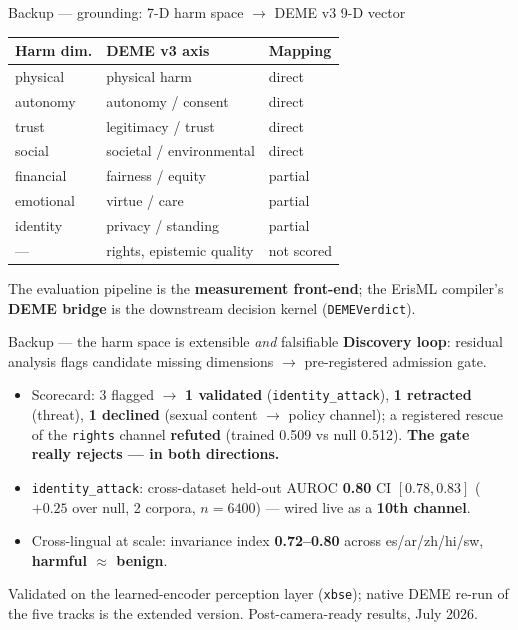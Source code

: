 \documentclass[aspectratio=169,11pt]{beamer}
\newcommand{\hi}[1]{\textcolor{cbblue}{\textbf{#1}}}
\newcommand{\gold}[1]{\textcolor{cborange}{\textbf{#1}}}
\begin{document}
\begin{frame}{Backup --- grounding: 7-D harm space $\rightarrow$ DEME v3 9-D vector}
\centering
\small
\begin{tabular}{@{}lll@{}}
\toprule
\textbf{Harm dim.} & \textbf{DEME v3 axis} & \textbf{Mapping}\\
\midrule
physical & physical harm & direct\\
autonomy & autonomy / consent & direct\\
trust & legitimacy / trust & direct\\
social & societal / environmental & direct\\
financial & fairness / equity & partial\\
emotional & virtue / care & partial\\
identity & privacy / standing & partial\\
--- & rights, epistemic quality & not scored\\
\bottomrule
\end{tabular}
\vfill
{\small The evaluation pipeline is the \hi{measurement front-end}; the ErisML compiler's \hi{DEME bridge} is the downstream decision kernel (\texttt{DEMEVerdict}).}
\end{frame}

\begin{frame}{Backup --- the harm space is extensible \emph{and} falsifiable}
\textbf{Discovery loop}: residual analysis flags candidate missing dimensions $\rightarrow$ pre-registered admission gate.
\begin{itemize}
  \item Scorecard: 3 flagged $\rightarrow$ \gold{1 validated} (\texttt{identity\_attack}), \gold{1 retracted} (threat), \gold{1 declined} (sexual content $\rightarrow$ policy channel); a registered rescue of the \texttt{rights} channel \gold{refuted} (trained 0.509 vs null 0.512). \hi{The gate really rejects --- in both directions.}
  \item \texttt{identity\_attack}: cross-dataset held-out AUROC \gold{0.80} CI $[0.78, 0.83]$ ($+0.25$ over null, 2 corpora, $n=6400$) --- wired live as a \hi{10th channel}.
  \item Cross-lingual at scale: invariance index \gold{0.72--0.80} across es/ar/zh/hi/sw, \hi{harmful $\approx$ benign}.
\end{itemize}
\vfill
{\scriptsize Validated on the learned-encoder perception layer (\texttt{xbse}); native DEME re-run of the five tracks is the extended version. Post-camera-ready results, July 2026.}
\end{frame}
\end{document}
